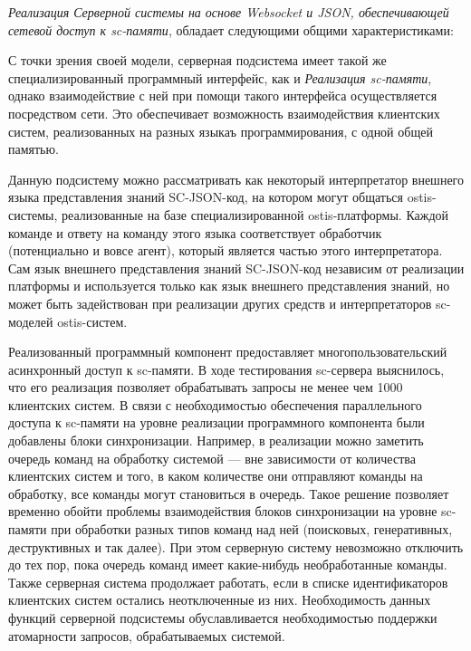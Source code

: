 \textit{Реализация Серверной системы на основе Websocket и JSON, обеспечивающей сетевой доступ к sc-памяти}, обладает следующими общими характеристиками:
\begin{textitemize}
    \item С точки зрения своей модели, серверная подсистема имеет такой же специализированный программный интерфейс, как и \textit{Реализация sc-памяти}, однако взаимодействие с ней при помощи такого интерфейса осуществляется посредством сети. Это обеспечивает возможность взаимодействия клиентских систем, реализованных на разных языкаъ программирования, с одной общей памятью.
    \item Данную подсистему можно рассматривать как некоторый интерпретатор внешнего языка представления знаний SC-JSON-код, на котором могут общаться ostis-системы, реализованные на базе специализированной ostis-платформы. Каждой команде и ответу на команду этого языка соответствует обработчик (потенциально и вовсе агент), который является частью этого интерпретатора. Сам язык внешнего представления знаний SC-JSON-код независим от реализации платформы и используется только как язык внешнего представления знаний, но может быть задействован при реализации других средств и интерпретаторов sc-моделей ostis-систем.
    \item Реализованный программный компонент предоставляет многопользовательский асинхронный доступ к sc-памяти. В ходе тестирования sc-сервера выяснилось, что его реализация позволяет обрабатывать запросы не менее чем 1000 клиентских систем. В связи с необходимостью обеспечения параллельного доступа к sc-памяти на уровне реализации программного компонента были добавлены блоки синхронизации. Например, в реализации можно заметить очередь команд на обработку системой --- вне зависимости от количества клиентских систем и того, в каком количестве они отправляют команды на обработку, все команды могут становиться в очередь. Такое решение позволяет временно обойти проблемы взаимодействия блоков синхронизации на уровне sc-памяти при обработки разных типов команд над ней (поисковых, генеративных, деструктивных и так далее). При этом серверную систему невозможно отключить до тех пор, пока очередь команд имеет какие-нибудь необработанные команды. Также серверная система продолжает работать, если в списке идентификаторов клиентских систем остались неотключенные из них. Необходимость данных функций серверной подсистемы обуславливается необходимостью поддержки атомарности запросов, обрабатываемых системой.

\end{textitemize}
